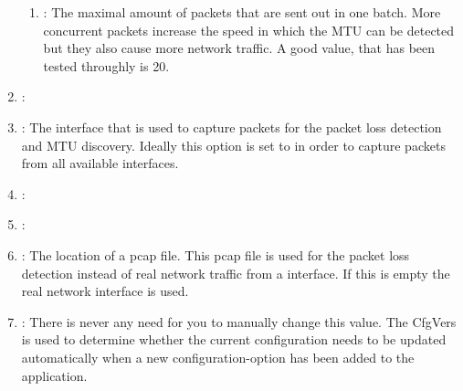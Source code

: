 \begin{enumerate}
\begin{enumerate}
	  \item {}: The maximal amount of packets that are sent out in one batch. More concurrent packets increase the speed in which the \acs{MTU} can be detected but they also cause more network traffic. A good value, that has been tested throughly is 20.
  \end{enumerate}
  \item {}: 
  \item {}: The interface that is used to capture packets for the packet loss detection and \acs{MTU} discovery. Ideally this option is set to  in order to capture packets from all available interfaces. 
  \item {}:  
  \item {}: 
  \item {}: The location of a pcap file. This pcap file is used for the packet loss detection instead of real network traffic from a interface. If this is empty the real network interface is used.
  \item {}: There is never any need for you to manually change this value. The CfgVers is used to determine whether the current configuration needs to be updated automatically when a new configuration-option has been added to the application.
\end{enumerate}

